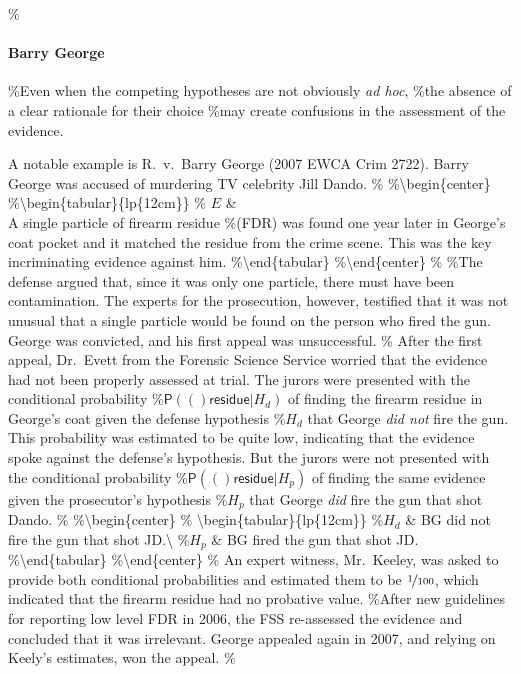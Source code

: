 \documentclass[10pt,dvipsnames,enabledeprecatedfontcommands]{scrartcl}
\let\oldparagraph\paragraph
\renewcommand{\paragraph}[1]{\oldparagraph{#1}\mbox{}}
\newcommand{\pr}[1]{\mathsf{P}(#1)}
\begin{document}
\%\paragraph{Barry George}

\%Even when the competing hypotheses are not obviously \textit{ad hoc},
\%the absence of a clear rationale for their choice \%may create
confusions in the assessment of the evidence.

A notable example is R.~v.~Barry George (2007 EWCA Crim 2722). Barry
George was accused of murdering TV celebrity Jill Dando. \%
\%\textbackslash{}begin\{center\}
\%\textbackslash{}begin\{tabular\}\{lp\{12cm\}\} \% \(E\) \&\\
A single particle of firearm residue \%(FDR) was found one year later in
George's coat pocket and it matched the residue from the crime scene.
This was the key incriminating evidence against him.
\%\textbackslash{}end\{tabular\} \%\textbackslash{}end\{center\} \%
\%\noindent  The defense argued that, since it was only one particle,
there must have been contamination. The experts for the prosecution,
however, testified that it was not unusual that a single particle would
be found on the person who fired the gun. George was convicted, and his
first appeal was unsuccessful. \% After the first appeal, Dr.~Evett from
the Forensic Science Service worried that the evidence had not been
properly assessed at trial. The jurors were presented with the
conditional probability \%\(\pr(\textsf{residue}\vert H_d)\) of finding
the firearm residue in George's coat given the defense hypothesis
\%\(H_d\) that George \textit{did not} fire the gun. This probability
was estimated to be quite low, indicating that the evidence spoke
against the defense's hypothesis. But the jurors were not presented with
the conditional probability \%\(\pr(\textsf{residue}\vert H_p)\) of
finding the same evidence given the prosecutor's hypothesis \%\(H_p\)
that George \textit{did} fire the gun that shot Dando. \%
\%\textbackslash{}begin\{center\} \%
\textbackslash{}begin\{tabular\}\{lp\{12cm\}\} \%\(H_d\) \& BG did not
fire the gun that shot JD.\textbackslash{} \%\(H_p\) \& BG fired the gun
that shot JD. \%\textbackslash{}end\{tabular\}
\%\textbackslash{}end\{center\} \% \noindent  An expert witness,
Mr.~Keeley, was asked to provide both conditional probabilities and
estimated them to be \(\nicefrac{1}{100}\), which indicated that the
firearm residue had no probative value. \%After new guidelines for
reporting low level FDR in 2006, the FSS re-assessed the evidence and
concluded that it was irrelevant. George appealed again in 2007, and
relying on Keely's estimates, won the appeal. \%
\end{document}
